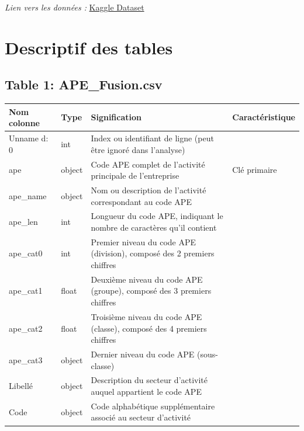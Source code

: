 \documentclass[mstat,12pt]{unswthesis}
\begin{document}
\medskip

\textit{Lien vers les données :}
\href{https://www.kaggle.com/datasets/briaclg/financial-data-of-french-compagnies/data?select=Profit+and+loss+-+Onthology.csv}{Kaggle Dataset}

\section{Descriptif des tables}\label{descriptif-des-tables}

\bigskip

\subsection{Table 1: APE\_Fusion.csv}\label{table-1-ape_fusion.csv}

\begin{table}[H]
\centering
\scriptsize
\begin{tabular}{|p{3.2cm}|p{1.2cm}|p{7.5cm}|p{2.5cm}|}
\hline
\textbf{Nom colonne} & \textbf{Type} & \textbf{Signification} & \textbf{Caractéristique} \\
\hline
Unname d: 0 & int & Index ou identifiant de ligne (peut être ignoré dans l'analyse) & \\
\hline
ape & object & Code APE complet de l'activité principale de l'entreprise & Clé primaire \\
\hline
ape\_name & object & Nom ou description de l'activité correspondant au code APE & \\
\hline
ape\_len & int & Longueur du code APE, indiquant le nombre de caractères qu'il contient & \\
\hline
ape\_cat0 & int & Premier niveau du code APE (division), composé des 2 premiers chiffres & \\
\hline
ape\_cat1 & float & Deuxième niveau du code APE (groupe), composé des 3 premiers chiffres & \\
\hline
ape\_cat2 & float & Troisième niveau du code APE (classe), composé des 4 premiers chiffres & \\
\hline
ape\_cat3 & object & Dernier niveau du code APE (sous-classe) & \\
\hline
Libellé & object & Description du secteur d'activité auquel appartient le code APE & \\
\hline
Code & object & Code alphabétique supplémentaire associé au secteur d'activité & \\
\hline
\end{tabular}
\footnotesize
\label{tab:ape_description}
\end{table}
\end{document}
